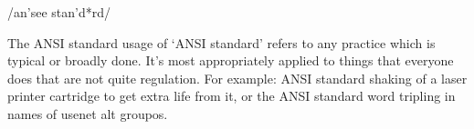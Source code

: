  /an'see stan'd*rd/

The ANSI standard usage of `ANSI standard' refers to any practice which is typical or broadly done. It's most appropriately applied to
things that everyone does that are not quite regulation. For example: ANSI standard shaking of a laser printer cartridge to get extra life
from it, or the ANSI standard word tripling in names of usenet alt groupos.

